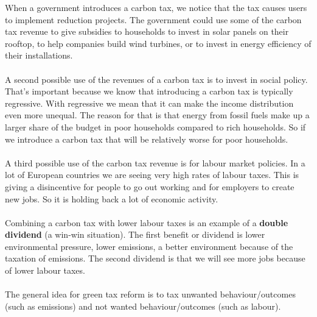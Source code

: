 \documentclass[../summary.tex]{subfiles}
\begin{document}
	When a government introduces a carbon tax, we notice that the tax causes users to implement reduction projects. The government could use some of the carbon tax revenue to give subsidies to households to invest in solar panels on their rooftop, to help companies build wind turbines, or to invest in energy efficiency of their installations. 
	\\\\
	A second possible use of the revenues of a carbon tax is to invest in social policy. That's important because we know that introducing a carbon tax is typically regressive. With regressive we mean that it can make the income distribution even more unequal. The reason for that is that energy from fossil fuels make up a larger share of the budget in poor households compared to rich households. So if we introduce a carbon tax that will be relatively worse for poor households. 
	\\\\
	A third possible use of the carbon tax revenue is for labour market policies. In a lot of European countries we are seeing very high rates of labour taxes. This is giving a disincentive for people to go out working and for employers to create new jobs. So it is holding back a lot of economic activity.
	\\\\
	Combining a carbon tax with lower labour taxes is an example of a \textbf{double dividend} (a win-win situation). The first benefit or dividend is lower environmental pressure, lower emissions, a better environment because of the taxation of emissions. The second dividend is that we will see more jobs because of lower labour taxes.
	\\\\
	The general idea for green tax reform is to tax unwanted behaviour/outcomes (such as emissions) and not wanted behaviour/outcomes (such as labour).
	\newpage
	
\end{document}
